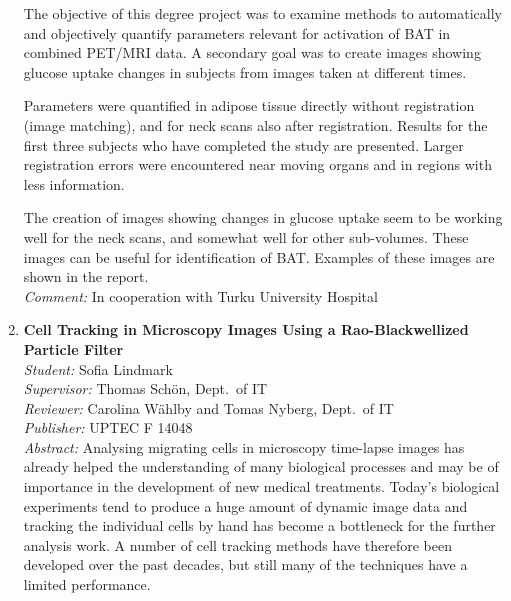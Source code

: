 \begin{small}
\begin{enumerate}
The objective of this degree project was to examine methods to automatically and objectively quantify parameters relevant for activation of BAT in combined PET/MRI data. A secondary goal was to create images showing glucose uptake changes in subjects from images taken at different times.

Parameters were quantified in adipose tissue directly without registration (image matching), and for neck scans also after registration. Results for the first three subjects who have completed the study are presented. Larger registration errors were encountered near moving organs and in regions with less information.

The creation of images showing changes in glucose uptake seem to be working well for the neck scans, and somewhat well for other sub-volumes. These images can be useful for identification of BAT. Examples of these images are shown in the report.\\
\emph{Comment: }In cooperation with Turku University Hospital

\item\textbf{Cell Tracking in Microscopy Images Using a Rao-Blackwellized Particle Filter}\\
  \emph{Student:} Sofia Lindmark\\
  \emph{Supervisor:} Thomas Sch\"{o}n, Dept.~of IT\\
  \emph{Reviewer:} Carolina W\"{a}hlby and Tomas Nyberg, Dept.~of IT \\
  \emph{Publisher:} UPTEC F 14048\\
  \emph{Abstract:} Analysing migrating cells in microscopy time-lapse images has already helped the understanding of many biological processes and may be of importance in the development of new medical treatments. Today's biological experiments tend to produce a huge amount of dynamic image data and tracking the individual cells by hand has become a bottleneck for the further analysis work. A number of cell tracking methods have therefore been developed over the past decades, but still many of the techniques have a limited performance.


\end{enumerate}
\end{small}
